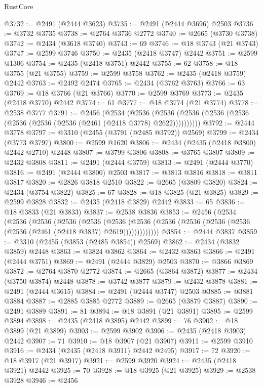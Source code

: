 \begin{lexlean}{RustCore}
\begin{coremodule}
@3732 := @2491 (@2444 @3623)
@3735 := @2491 (@2444 @3696) @2503
@3736 := @3732 @3735
@3738 := @2764 @3736 @2772
@3740 := @2665 (@3730 @3738)
@3742 := @2434 (@3618 @3740)
@3743 := 69
@3746 := @18 @3743 (@21 @3743)
@3747 := @2599 @3746
@3750 := @2435 (@2418 @3747) @2442
@3751 := @2599 @1306
@3754 := @2435 (@2418 @3751) @2442
@3755 := 62
@3758 := @18 @3755 (@21 @3755)
@3759 := @2599 @3758
@3762 := @2435 (@2418 @3759) @2442
@3763 := @2492 @2474
@3765 := @2434 (@3762 @3763)
@3766 := 63
@3769 := @18 @3766 (@21 @3766)
@3770 := @2599 @3769
@3773 := @2435 (@2418 @3770) @2442
@3774 := 61
@3777 := @18 @3774 (@21 @3774)
@3778 := @2538 @3777
@3791 := @2456
    (@2534
      (@2536 (@2536 (@2536 (@2536 (@2536 (@2536 (@2536 (@2536 (@2461 (@2418 @3778) @2622))))))))))
@3792 := @2444 @3778
@3797 := @3310 (@2455 (@3791 (@2485 @3792)) @2569)
@3799 := @2434 (@3773 @3797)
@3800 := @2599 @1620
@3806 := @2434 (@2435 (@2418 @3800) @2442 @2710) @2448
@3807 := @3799 @3806
@3808 := @3765 @3807
@3809 := @2432 @3808
@3811 := @2491 (@2444 @3759)
@3813 := @2491 (@2444 @3770)
@3816 := @2491 (@2444 @3800) @2503
@3817 := @3813 @3816
@3818 := @3811 @3817
@3820 := @2826 @3818 @2510
@3822 := @2665 (@3809 @3820)
@3824 := @2434 (@3754 @3822)
@3825 := 67
@3828 := @18 @3825 (@21 @3825)
@3829 := @2599 @3828
@3832 := @2435 (@2418 @3829) @2442
@3833 := 65
@3836 := @18 @3833 (@21 @3833)
@3837 := @2538 @3836
@3853 := @2456
    (@2534
      (@2536
        (@2536
          (@2536
            (@2536
              (@2536
                (@2536 (@2536 (@2536 (@2536 (@2536 (@2536 (@2461 (@2418 @3837) @2619)))))))))))))
@3854 := @2444 @3837
@3859 := @3310 (@2455 (@3853 (@2485 @3854)) @2569)
@3862 := @2434 (@3832 @3859) @2448
@3863 := @3824 @3862
@3864 := @2432 @3863
@3866 := @2491 (@2444 @3751)
@3869 := @2491 (@2444 @3829) @2503
@3870 := @3866 @3869
@3872 := @2764 @3870 @2772
@3874 := @2665 (@3864 @3872)
@3877 := @2434 (@3750 @3874) @2448
@3878 := @3742 @3877
@3879 := @2432 @3878
@3881 := @2491 (@2444 @3615)
@3884 := @2491 (@2444 @3747) @2503
@3885 := @3881 @3884
@3887 := @2885 @3885 @2772
@3889 := @2665 (@3879 @3887)
@3890 := @2491 @3889
@3891 := 81
@3894 := @18 @3891 (@21 @3891)
@3895 := @2599 @3894
@3898 := @2435 (@2418 @3895) @2442
@3899 := 76
@3902 := @18 @3899 (@21 @3899)
@3903 := @2599 @3902
@3906 := @2435 (@2418 @3903) @2442
@3907 := 71
@3910 := @18 @3907 (@21 @3907)
@3911 := @2599 @3910
@3916 := @2434 (@2435 (@2418 @3911) @2442 @2495)
@3917 := 72
@3920 := @18 @3917 (@21 @3917)
@3921 := @2599 @3920
@3924 := @2435 (@2418 @3921) @2442
@3925 := 70
@3928 := @18 @3925 (@21 @3925)
@3929 := @2538 @3928
@3946 := @2456

\end{coremodule}
\end{lexlean}
